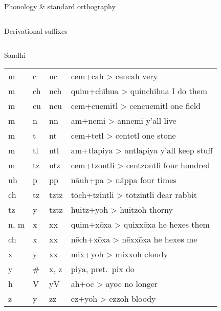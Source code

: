 \documentclass[12pt]{beamer}
\newcommand{\nah}[1]{\textcolor{nahgrn}{#1}}
\newcommand{\trs}[1]{\textcolor{nahblu}{#1}}
\begin{document}
\begin{frame}
\begin{columns}[t]
\begin{column}{.22\linewidth}
\begin{block}{Phonology \& standard orthography}
\begin{threeparttable}
\begin{tablenotes}
\begin{frame}
\begin{columns}[t]
\begin{column}{.22\linewidth}
\begin{block}{Derivational suffixes}
\begin{threeparttable}
\begin{multicols}{2}
\begin{itemize}
\begin{column}{.26\linewidth}
\begin{block}{Sandhi}
\begin{threeparttable}
\begin{tabular}{l@{+ }l@{> }ll}
            \nah{m}    & \nah{c}  & \nah{nc}              & \nah{cem}+\nah{cah} > \nah{cencah} \trs{very}                   \\
            \nah{m}    & \nah{ch} & \nah{nch}             & \nah{quim}+\nah{chīhua} > \nah{quinchīhua} \trs{I do them}      \\
            \nah{m}    & \nah{cu} & \nah{ncu}             & \nah{cem}+\nah{cuemitl} > \nah{cencuemitl} \trs{one field}      \\
            \nah{m}    & \nah{n}  & \nah{nn}              & \nah{am}+\nah{nemi} > \nah{annemi} \trs{y'all live}             \\
            \nah{m}    & \nah{t}  & \nah{nt}              & \nah{cem}+\nah{tetl} > \nah{centetl} \trs{one stone}            \\
            \nah{m}    & \nah{tl} & \nah{ntl}             & \nah{am}+\nah{tlapiya} > \nah{antlapiya} \trs{y'all keep stuff} \\
            \nah{m}    & \nah{tz} & \nah{ntz}             & \nah{cem}+\nah{tzontli} > \nah{centzontli} \trs{four hundred}   \\
            \nah{uh}   & \nah{p}  & \nah{pp}              & \nah{nāuh}+\nah{pa} > \nah{nāppa} \trs{four times}              \\
            \nah{ch}   & \nah{tz} & \nah{tztz}\tnote{1}   & \nah{tōch}+\nah{tzintli} > \nah{tōtzintli} \trs{dear rabbit}    \\
            \nah{tz}   & \nah{y}  & \nah{tztz}\tnote{1}   & \nah{huitz}+\nah{yoh} > \nah{huitzoh} \trs{thorny}              \\
            \nah{n, m} & \nah{x}  & \nah{xx}\tnote{1}     & \nah{quim}+\nah{xōxa} > \nah{quixxōxa} \trs{he hexes them}      \\
            \nah{ch}   & \nah{x}  & \nah{xx}\tnote{1}     & \nah{nēch}+\nah{xōxa} > \nah{nēxxōxa} \trs{he hexes me}         \\
            \nah{x}    & \nah{y}  & \nah{xx}\tnote{1}     & \nah{mix}+\nah{yoh} > \nah{mixxoh} \trs{cloudy}                 \\
            \nah{y}    & \nah{\#} & \nah{x, z}\tnote{2}{} & \nah{piya}, pret.~\nah{pix} \trs{do}                            \\
            \nah{h}    & \nah{V}  & \nah{yV}              & \nah{ah}+\nah{oc} > \nah{ayoc} \trs{no longer}                  \\
            \nah{z}    & \nah{y}  & \nah{zz}\tnote{1}     & \nah{ez}+\nah{yoh} > \nah{ezzoh} \trs{bloody}                   \\

\end{tabular}
\end{threeparttable}
\end{block}
\end{column}
\end{itemize}
\end{multicols}
\end{threeparttable}
\end{block}
\end{column}
\end{columns}
\end{frame}
\end{tablenotes}
\end{threeparttable}
\end{block}
\end{column}
\end{columns}
\end{frame}
\end{document}
